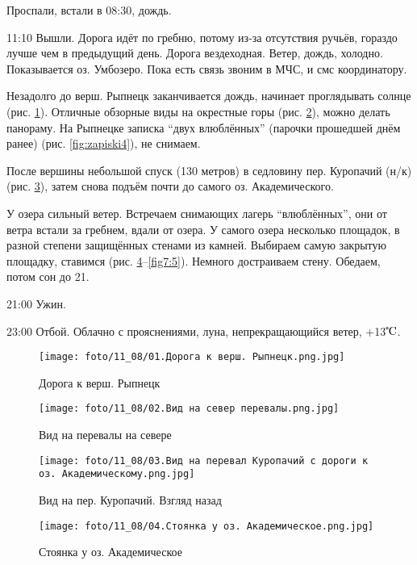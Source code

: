 Проспали, встали в 08:30, дождь.

11:10 Вышли.
Дорога идёт по гребню, потому из-за отсутствия ручьёв, гораздо лучше чем в предыдущий день.
Дорога вездеходная. Ветер, дождь, холодно. Показывается оз. Умбозеро. Пока есть связь звоним в МЧС, и смс координатору.

Незадолго до верш. Рыпнецк заканчивается дождь, начинает проглядывать солнце (рис. \ref{fig7:1}).
Отличные обзорные виды на окрестные горы (рис. \ref{fig7:2}),
можно делать панораму. На Рыпнецке записка ``двух влюблённых'' (парочки прошедшей днём ранее) (рис. \ref{fig:zapiski4}),
не снимаем.

После вершины небольшой спуск (130 метров) в седловину пер. Куропачий (н/к) (рис. \ref{fig7:3}), затем снова подъём почти
до самого оз. Академического.

У озера сильный ветер. Встречаем снимающих лагерь ``влюблённых'', они от ветра  встали за гребнем, вдали от озера.
У самого озера несколько площадок, в разной степени защищённых стенами из камней.
Выбираем самую закрытую площадку, ставимся (рис. \ref{fig7:4}--\ref{fig7:5}). Немного достраиваем стену. Обедаем, потом сон до 21.

21:00 Ужин.

23:00 Отбой. Облачно с прояснениями, луна, непрекращающийся ветер, +13$\tccentigrade$.

\begin{figure}
    \centering
    \texttt{[image: foto/11\_08/01.Дорога к верш. Рыпнецк.png.jpg]}
    \caption{Дорога к верш. Рыпнецк}
    \label{fig7:1}
\end{figure}

\begin{figure}
    \centering
    \texttt{[image: foto/11\_08/02.Вид на север перевалы.png.jpg]}
    \caption{Вид на перевалы на севере}
    \label{fig7:2}
\end{figure}

\begin{figure}
    \centering
    \texttt{[image: foto/11\_08/03.Вид на перевал Куропачий с дороги к оз. Академическому.png.jpg]}
    \caption{Вид на пер. Куропачий. Взгляд назад}
    \label{fig7:3}
\end{figure}

\begin{figure}
    \centering
    \texttt{[image: foto/11\_08/04.Стоянка у оз. Академическое.png.jpg]}
    \caption{Стоянка у оз. Академическое}
    \label{fig7:4}
\end{figure}

